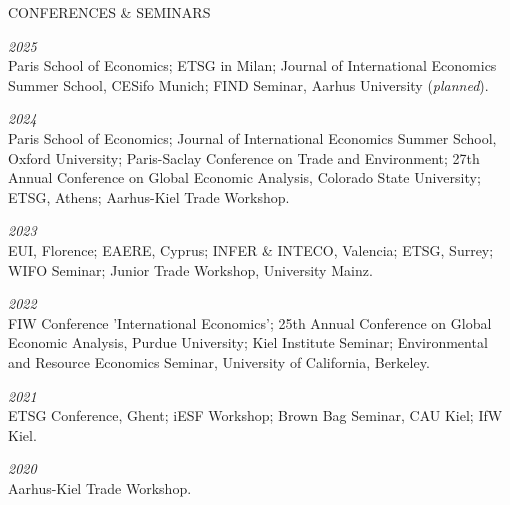 \documentclass{article}
\begin{document}

\begin{minipage}[t]{0.12\textwidth}
    {\selectfont CONFERENCES \& SEMINARS} \\
\end{minipage}
\hspace{5mm}
\begin{minipage}[t]{0.8\textwidth}
    \textit{2025} \\
    Paris School of Economics; ETSG in Milan; Journal of International Economics Summer School, CESifo Munich; FIND Seminar, Aarhus University (\textit{planned}). \par
    \textit{2024} \\
    Paris School of Economics; Journal of International Economics Summer School, Oxford University; Paris-Saclay Conference on Trade and Environment; 27th Annual Conference on Global Economic Analysis, Colorado State University; ETSG, Athens; Aarhus-Kiel Trade Workshop. \par
    \textit{2023} \\
    EUI, Florence; EAERE, Cyprus; INFER \& INTECO, Valencia; ETSG, Surrey; WIFO Seminar; Junior Trade Workshop, University Mainz. \par
    \textit{2022} \\
    FIW Conference 'International Economics'; 25th Annual Conference on Global Economic Analysis, Purdue University; Kiel Institute Seminar; Environmental and Resource Economics Seminar, University of California, Berkeley.  \par
    \textit{2021} \\
    ETSG Conference, Ghent; iESF Workshop; Brown Bag Seminar, CAU Kiel; IfW Kiel. \par
    \textit{2020} \\
    Aarhus-Kiel Trade Workshop. \par
\end{minipage}
\medskip

\end{document}
